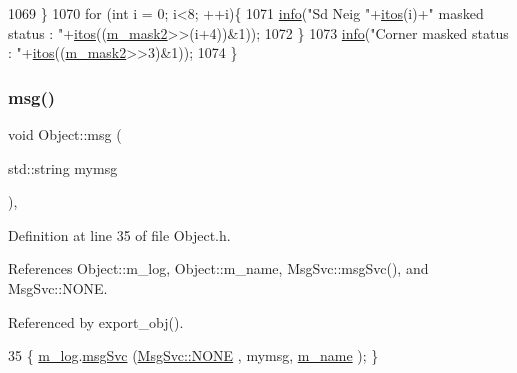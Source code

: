 \begin{DoxyCode}
1069   \}
1070   \textcolor{keywordflow}{for} (\textcolor{keywordtype}{int} i = 0; i<8; ++i)\{
1071     \hyperlink{classObject_a644fd329ea4cb85f54fa6846484b84a8}{info}(\textcolor{stringliteral}{"Sd Neig "}+\hyperlink{Tools_8h_af330027dbdafb9a30768b3613c553e60}{itos}(i)+\textcolor{stringliteral}{" masked status : "}+\hyperlink{Tools_8h_af330027dbdafb9a30768b3613c553e60}{itos}((\hyperlink{classFEB__v1_a25f03f6de00618dd575fc1f77a9af9ee}{m\_mask2}>>(i+4))&1));
1072   \}
1073   \hyperlink{classObject_a644fd329ea4cb85f54fa6846484b84a8}{info}(\textcolor{stringliteral}{"Corner masked status : "}+\hyperlink{Tools_8h_af330027dbdafb9a30768b3613c553e60}{itos}((\hyperlink{classFEB__v1_a25f03f6de00618dd575fc1f77a9af9ee}{m\_mask2}>>3)&1));
1074 \}
\end{DoxyCode}
\mbox{\label{classObject_a58b2d0618c2d08cf2383012611528d97}} 
\subsubsection{\texorpdfstring{msg()}{msg()}\hspace{0.1cm}{\footnotesize\ttfamily [1/2]}}
{\footnotesize\ttfamily void Object\+::msg (\begin{DoxyParamCaption}\item[{std\+::string}]{mymsg }\end{DoxyParamCaption})\hspace{0.3cm}{\ttfamily [inline]}, {\ttfamily [inherited]}}



Definition at line 35 of file Object.\+h.



References Object\+::m\+\_\+log, Object\+::m\+\_\+name, Msg\+Svc\+::msg\+Svc(), and Msg\+Svc\+::\+N\+O\+NE.



Referenced by export\+\_\+obj().


\begin{DoxyCode}
35 \{ \hyperlink{classObject_a0d269813dd7ac1f24bc143031e2963f2}{m\_log}.\hyperlink{classMsgSvc_ad25f18047920cc59a314e5098259711c}{msgSvc} (\hyperlink{classMsgSvc_ae671eb7301996cd049d2da8a65925926a9be9ae32fed8e1e6eba4a58692210fbd}{MsgSvc::NONE}    , mymsg, \hyperlink{classObject_a8b83c95c705d2c3ba0d081fe1710f48d}{m\_name} ); \}
\end{DoxyCode}
\mbox{\label{classObject_ac5d59299273cee27aacf7de00d2e7034}} 
